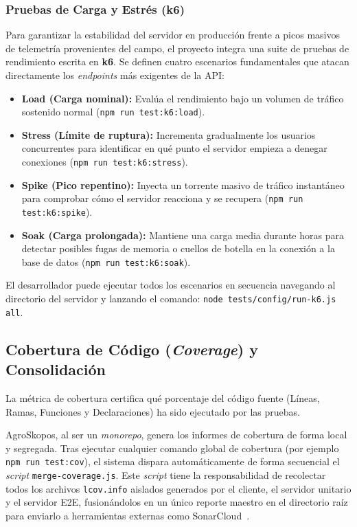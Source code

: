 \subsubsection{Pruebas de Carga y Estrés (k6)}
Para garantizar la estabilidad del servidor en producción frente a picos masivos de telemetría provenientes del campo, el proyecto integra una suite de pruebas de rendimiento escrita en \textbf{k6}. Se definen cuatro escenarios fundamentales que atacan directamente los \textit{endpoints} más exigentes de la API:
\begin{itemize}
    \item \textbf{Load (Carga nominal):} Evalúa el rendimiento bajo un volumen de tráfico sostenido normal (\texttt{npm run test:k6:load}).
    \item \textbf{Stress (Límite de ruptura):} Incrementa gradualmente los usuarios concurrentes para identificar en qué punto el servidor empieza a denegar conexiones (\texttt{npm run test:k6:stress}).
    \item \textbf{Spike (Pico repentino):} Inyecta un torrente masivo de tráfico instantáneo para comprobar cómo el servidor reacciona y se recupera (\texttt{npm run test:k6:spike}).
    \item \textbf{Soak (Carga prolongada):} Mantiene una carga media durante horas para detectar posibles fugas de memoria o cuellos de botella en la conexión a la base de datos (\texttt{npm run test:k6:soak}).
\end{itemize}
El desarrollador puede ejecutar todos los escenarios en secuencia navegando al directorio del servidor y lanzando el comando: \texttt{node tests/config/run-k6.js all}.

\subsection{Cobertura de Código (\textit{Coverage}) y Consolidación}
La métrica de cobertura certifica qué porcentaje del código fuente (Líneas, Ramas, Funciones y Declaraciones) ha sido ejecutado por las pruebas.

AgroSkopos, al ser un \textit{monorepo}, genera los informes de cobertura de forma local y segregada. Tras ejecutar cualquier comando global de cobertura (por ejemplo \texttt{npm run test:cov}), el sistema dispara automáticamente de forma secuencial el \textit{script} \texttt{merge-coverage.js}. Este \textit{script} tiene la responsabilidad de recolectar todos los archivos \texttt{lcov.info} aislados generados por el cliente, el servidor unitario y el servidor E2E, fusionándolos en un único reporte maestro en el directorio raíz para enviarlo a herramientas externas como SonarCloud~\cite{sonarqube}.

